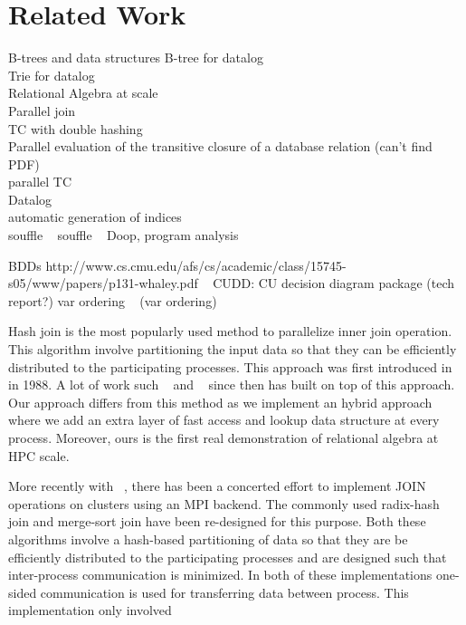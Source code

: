 
\section{Related Work}
\label{sec:related}

B-trees and data structures
B-tree for datalog ~\cite{btree-ppopp}\\
Trie for datalog ~\cite{brie-pmam}
\\

Relational Algebra at scale\\
Parallel join ~\cite{Barthels:2017:DJA:3055540.3055545} \\
TC with double hashing ~\cite{Cheiney:1990:PST:94362.94445} \\
Parallel evaluation of the transitive closure of a database relation (can’t find PDF)\\
parallel TC ~\cite{Cacace:1991:OPS:111828.111831}\\


Datalog\\
automatic generation of indices ~\cite{Subotic:2018:AIS:3282495.3302538}\\
souffle ~\cite{10.1007/978-3-319-41540-6_23}
souffle ~\cite{Scholz:2016:FLP:2892208.2892226}
Doop, program analysis ~\cite{Smaragdakis:2010:UDF:2185923.2185939}


BDDs
http://www.cs.cmu.edu/afs/cs/academic/class/15745-s05/www/papers/p131-whaley.pdf ~\cite{Whaley:2004:CCP:996893.996859}
CUDD: CU decision diagram package (tech report?)
var ordering ~\cite{580029}
(var ordering) ~\cite{1586251}




Hash join is the most popularly used method to parallelize inner join
operation. This algorithm involve partitioning the input data so that they can be efficiently distributed
to the participating processes. This approach was first introduced in ~\cite{Valduriez:1988:PET:54616.54618} in 1988.
A lot of work such ~\cite{Cheiney:1990:PST:94362.94445} and ~\cite{Cacace:1991:OPS:111828.111831} since then has built on top of this approach. 
Our approach differs from this method as we implement an hybrid approach 
where we add an extra layer of fast access and lookup data structure at every process. 
Moreover, ours is the first real demonstration of relational algebra at HPC scale.

More recently with ~\cite{Barthels:2017:DJA:3055540.3055545}, there has been a concerted effort to implement JOIN operations on
clusters using an MPI backend. The commonly used radix-hash join and merge-sort join have been re-designed
for this purpose. Both these algorithms involve a hash-based partitioning of data so that they are be efficiently
distributed to the participating processes and are designed such that inter-process communication is minimized.
In both of these implementations one-sided communication is used for transferring data between process. This implementation
only involved 

